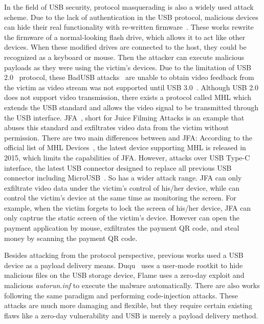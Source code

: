 In the field of \ac{USB} security, protocol masquerading is also a widely used
attack scheme. Due to the lack of authentication in the \ac{USB} protocol, malicious
devices can hide their real functionality with re-written
firmware~\cite{rubber,badusb,rubberducky2020,usbbypassing,iseeyou,usbdriver}.
These works rewrite the firmware of a normal-looking flash drive, which allows
it to act like other devices. When these modified drives are connected to the
host, they could be recognized as a keyboard or mouse. Then the attacker can
execute malicious payloads as they were using the victim's devices. Due to the
limitation of \ac{USB} 2.0~\cite{usb20} protocol, these BadUSB
attacks~\cite{badusb} are unable to obtain video feedback from the victim
as video stream was not supported until \ac{USB} 3.0~\cite{usb30}. Although \ac{USB} 2.0 does not
support video transmission, there exists a protocol called \ac{MHL} which extends the \ac{USB} standard and allows the video signal to
be transmitted through the \ac{USB} interface. JFA~\cite{JFC}, short for Juice Filming Attacks is an example that abuses this standard and exfiltrates video data
from the victim without permission. 
There are two main differences between \tool and JFA:  According to the official list of \ac{MHL} Devices~\cite{MHLlist}, the latest device supporting \ac{MHL} is released in 2015, which limits the capabilities of JFA. However, \tool attacks over \ac{USB} Type-C interface, the latest \ac{USB} connector designed to replace all previous USB connector including MicroUSB~\cite{li2018usb}. So \tool has a wider attack range.  JFA can only exfiltrate video data under the victim's control of his/her device, while \tool can control the victim's device at the same time as monitoring the screen. For example, when the victim forgets to lock the screen of his/her device, JFA can only captrue the static screen of the victim's device. However \tool can open the payment application by mouse, exfiltrates the payment QR code, and steal money by scanning the payment QR code.

Besides attacking from the protocol perspective, previous works used a
\ac{USB} device as a payload delivery means. Duqu~\cite{duqu} uses a user-mode
rootkit to hide malicious files on the \ac{USB} storage device, Flame\cite{flame} uses a
zero-day exploit and malicious \textit{autorun.inf} to execute the malware
automatically. There are also works \cite{brain,stuxnet,conficker}
following the same paradigm and performing code-injection attacks. These
attacks are much more damaging and flexible,
but they require certain existing flaws like a zero-day vulnerability\cite{zero-day}  and \ac{USB} is merely
a payload delivery method.

